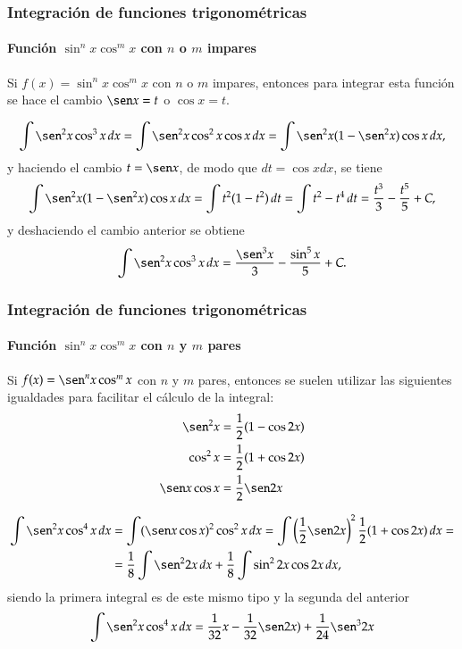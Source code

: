 \begin{frame}
\frametitle{Integración de funciones trigonométricas}
\framesubtitle{Función $\sin^n x\cos^m x$ con $n$ o $m$ impares}
Si $f(x)=\sin^n x\cos^m x$ con $n$ o $m$ impares, entonces para integrar esta función se hace el cambio $\sen x = t$ o
$\cos x =t$.

\[
\int \sen^2 x\cos^3 x\, dx = \int \sen^2 x\cos^2 x\cos x\, dx = \int \sen^2 x(1-\sen^2 x)\cos x\, dx,
\]
y haciendo el cambio $t=\sen x$, de modo que $dt = \cos x dx$, se tiene
\[
\int \sen^2 x(1-\sen^2 x)\cos x\, dx = \int t^2(1-t^2)\, dt = \int t^2-t^4 \, dt = \frac{t^3}{3}-\frac{t^5}{5}+C,
\]
y deshaciendo el cambio anterior se obtiene
\[
\int \sen^2 x\cos^3 x\, dx = \frac{\sen^3 x}{3}-\frac{\sin^5 x}{5}+C.
\]
\end{frame}


\begin{frame}
\frametitle{Integración de funciones trigonométricas}
\framesubtitle{Función $\sin^n x\cos^m x$ con $n$ y $m$ pares}
Si $f(x)=\sen^n x\cos^m x$ con $n$ y $m$ pares, entonces se suelen utilizar las siguientes igualdades para facilitar el
cálculo de la integral:
\begin{align*}
\sen^2 x &= \frac{1}{2}(1-\cos 2x)\\
\cos^2 x &= \frac{1}{2}(1+\cos 2x)\\
\sen x\cos x &= \frac{1}{2}\sen 2x
\end{align*}

\begin{align*}
\int \sen^2 x\cos^4 x\, dx &= \int (\sen x\cos x)^2\cos^2 x\, dx = \int \left(\frac{1}{2}\sen
2x\right)^2\frac{1}{2}(1+\cos 2x)\,dx =\\
&= \frac{1}{8}\int \sen^2 2x\,dx+\frac{1}{8}\int \sin^2 2x \cos 2x\,dx,
\end{align*}
siendo la primera integral es de este mismo tipo y la segunda del anterior
\[
\int \sen^2 x\cos^4 x\, dx = \frac{1}{32}x-\frac{1}{32}\sen 2x)+\frac{1}{24}\sen^3 2x
\] 
\end{frame}



